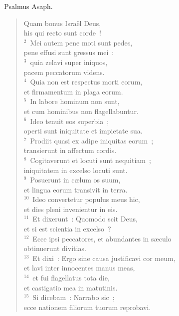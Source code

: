 \bchapter
\lettrine[lines=3,image=true,loversize=0.05,lraise=-0.03]{P}{}salmus Asaph. \begin{flushleft}\begin{verse}\vspace{6pt}Quam bonus Isra\"el Deus,\\ his qui recto sunt corde~!\\
${}^{2}$~Mei autem pene moti sunt pedes,\\ pene effusi sunt gressus mei~:\\
${}^{3}$~quia zelavi super iniquos,\\ pacem peccatorum videns.\\
${}^{4}$~Quia non est respectus morti eorum,\\ et firmamentum in plaga eorum.\\
${}^{5}$~In labore hominum non sunt,\\ et cum hominibus non flagellabuntur.\\
${}^{6}$~Ideo tenuit eos superbia~;\\ operti sunt iniquitate et impietate sua.\\
${}^{7}$~Prodiit quasi ex adipe iniquitas eorum~;\\ transierunt in affectum cordis.\\
${}^{8}$~Cogitaverunt et locuti sunt nequitiam~;\\ iniquitatem in excelso locuti sunt.\\
${}^{9}$~Posuerunt in c\ae lum os suum,\\ et lingua eorum transivit in terra.\\
${}^{10}$~Ideo convertetur populus meus hic,\\ et dies pleni invenientur in eis.\\
${}^{11}$~Et dixerunt~: Quomodo scit Deus,\\ et si est scientia in excelso~?\\
${}^{12}$~Ecce ipsi peccatores, et abundantes in s\ae culo\\ obtinuerunt divitias.\\
${}^{13}$~Et dixi~: Ergo sine causa justificavi cor meum,\\ et lavi inter innocentes manus meas,\\
${}^{14}$~et fui flagellatus tota die,\\ et castigatio mea in matutinis.\\
${}^{15}$~Si dicebam~: Narrabo sic~;\\ ecce nationem filiorum tuorum reprobavi.\\

\end{verse}
\end{flushleft}
